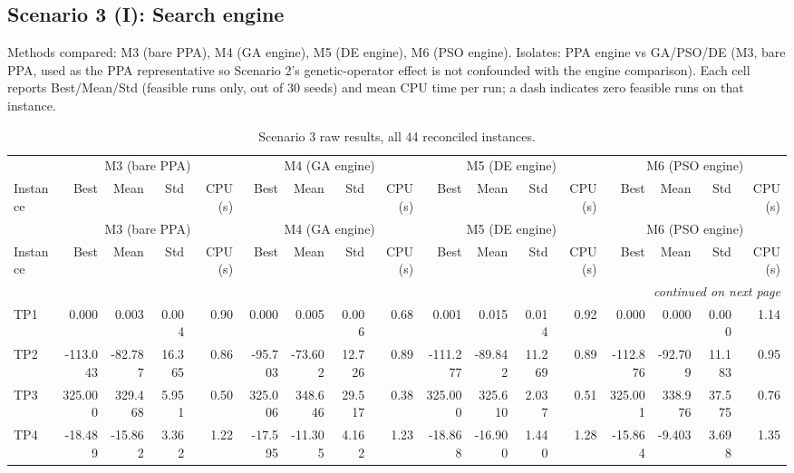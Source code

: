 \subsection{Scenario 3 (I): Search engine}
\label{app:scenario3}
Methods compared: M3 (bare PPA), M4 (GA engine), M5 (DE engine), M6 (PSO engine). Isolates: PPA engine vs GA/PSO/DE (M3, bare PPA, used as the PPA representative so Scenario 2's genetic-operator effect is not confounded with the engine comparison). Each cell reports Best/Mean/Std (feasible runs only, out of 30 seeds) and mean CPU time per run; a dash indicates zero feasible runs on that instance.

\begingroup\scriptsize
\begin{longtable}{lrrrrrrrrrrrrrrrr}
\caption{Scenario 3 raw results, all 44 reconciled instances.}\label{tab:scenario3}\\
\toprule
 & \multicolumn{4}{c}{M3 (bare PPA)} & \multicolumn{4}{c}{M4 (GA engine)} & \multicolumn{4}{c}{M5 (DE engine)} & \multicolumn{4}{c}{M6 (PSO engine)} \\
\cmidrule(lr){2-5} \cmidrule(lr){6-9} \cmidrule(lr){10-13} \cmidrule(lr){14-17}
Instance & Best & Mean & Std & CPU (s) & Best & Mean & Std & CPU (s) & Best & Mean & Std & CPU (s) & Best & Mean & Std & CPU (s) \\
\midrule
\endfirsthead
\toprule
 & \multicolumn{4}{c}{M3 (bare PPA)} & \multicolumn{4}{c}{M4 (GA engine)} & \multicolumn{4}{c}{M5 (DE engine)} & \multicolumn{4}{c}{M6 (PSO engine)} \\
\cmidrule(lr){2-5} \cmidrule(lr){6-9} \cmidrule(lr){10-13} \cmidrule(lr){14-17}
Instance & Best & Mean & Std & CPU (s) & Best & Mean & Std & CPU (s) & Best & Mean & Std & CPU (s) & Best & Mean & Std & CPU (s) \\
\midrule
\endhead
\midrule\multicolumn{17}{r}{\emph{continued on next page}}\\\midrule
\endfoot
\bottomrule
\endlastfoot
TP1 & 0.000 & 0.003 & 0.004 & 0.90 & 0.000 & 0.005 & 0.006 & 0.68 & 0.001 & 0.015 & 0.014 & 0.92 & 0.000 & 0.000 & 0.000 & 1.14 \\
TP2 & -113.043 & -82.787 & 16.365 & 0.86 & -95.703 & -73.602 & 12.726 & 0.89 & -111.277 & -89.842 & 11.269 & 0.89 & -112.876 & -92.709 & 11.183 & 0.95 \\
TP3 & 325.000 & 329.468 & 5.951 & 0.50 & 325.006 & 348.646 & 29.517 & 0.38 & 325.000 & 325.610 & 2.037 & 0.51 & 325.001 & 338.976 & 37.575 & 0.76 \\
TP4 & -18.489 & -15.862 & 3.362 & 1.22 & -17.595 & -11.305 & 4.162 & 1.23 & -18.868 & -16.900 & 1.440 & 1.28 & -15.864 & -9.403 & 3.698 & 1.35 \\

\end{longtable}
